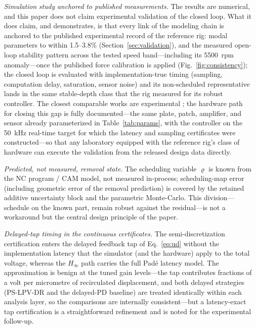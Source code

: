 \documentclass[preprint,12pt]{elsarticle}
\newcommand{\hinf}{H_\infty}
\begin{document}
\emph{Simulation study anchored to published measurements.} The
results are numerical, and this paper does not claim experimental
validation of the closed loop. What it does claim, and demonstrates, is
that every link of the modeling chain is anchored to the published
experimental record of the reference rig: modal parameters to within
1.5--3.8\% (Section~\ref{sec:validation}), and the measured open-loop
stability pattern across the tested speed band---including its
5500~rpm anomaly---once the published force calibration is applied
(Fig.~\ref{fig:consistency}); the closed loop is evaluated with
implementation-true timing (sampling, computation delay, saturation,
sensor noise) and its non-scheduled representative lands in the same
stable-depth class that the rig measured for its robust controller.
The closest comparable works are experimental
\cite{du2024robust,brand2025lpv,jmp2026spindle}; the hardware path for
closing this gap is fully documented---the same plate, patch,
amplifier, and sensor already parameterized in
Table~\ref{tab:params}, with the controller on the 50~kHz real-time
target for which the latency and sampling certificates were
constructed---so that any laboratory equipped with the reference
rig's class of hardware can execute the validation from the released
design data directly.

\emph{Predicted, not measured, removal state.} The scheduling variable
$\varrho$ is known from the NC program / CAM model, not measured
in-process; scheduling-map error (including geometric error of the
removal prediction) is covered by the retained additive uncertainty
block and the parametric Monte-Carlo. This division---schedule on the
known part, remain robust against the residual---is not a workaround
but the central design principle of the paper.

\emph{Delayed-tap timing in the continuous certificates.} The
semi-discretization certification enters the delayed feedback tap of
Eq.~\eqref{eq:ud} without the implementation latency that the simulator
(and the hardware) apply to the total voltage, whereas the $\hinf$ path
carries the full Pad\'e latency model. The approximation is benign at
the tuned gain levels---the tap contributes fractions of a volt per
micrometre of recirculated displacement, and both delayed strategies
(PS-LPV-DR and the delayed-PD baseline) are treated identically within
each analysis layer, so the comparisons are internally consistent---but
a latency-exact tap certification is a straightforward refinement and
is noted for the experimental follow-up.
\end{document}
